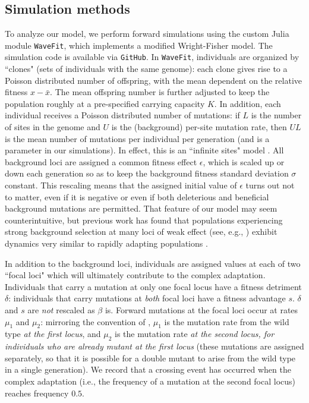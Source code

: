 \documentclass[10pt,twocolumn,twoside]{gsajnl}
\begin{document}
\begin{spacing}{1.5}
\section{Simulation methods}

To analyze our model, we perform forward simulations using the custom Julia module \texttt{WaveFit}, which implements a modified Wright-Fisher model.
The simulation code is available via \texttt{GitHub}.
In \texttt{WaveFit}, individuals are organized by ``clones" (sets of individuals with the same genome): each clone gives rise to a Poisson distributed number of offspring, with the mean dependent on the relative fitness $x-\bar{x}$.
The mean offspring number is further adjusted to keep the population roughly at a pre-specified carrying capacity $K$.
In addition, each individual receives a Poisson distributed number of mutations: if $L$ is the number of sites in the genome and $U$ is the (background) per-site mutation rate, then $UL$ is the mean number of mutations per individual per generation (and is a parameter in our simulations).
In effect, this is an ``infinite sites" model \citep{Kimura:1971,Watterson:1975}.
All background loci are assigned a common fitness effect $\epsilon$, which is scaled up or down each generation so as to keep the background fitness standard deviation $\sigma$ constant.
This rescaling means that the assigned initial value of $\epsilon$ turns out not to matter, even if it is negative or even if both deleterious and beneficial background mutations are permitted.
That feature of our model may seem counterintuitive, but previous work has found that populations experiencing strong background selection at many loci of weak effect (see, e.g., \citet{cvijovic_2018}) exhibit dynamics very similar to rapidly adapting populations \citep{desai_fisher_2007, neher_shraiman_2011}.

In addition to the background loci, individuals are assigned values at each of two ``focal loci" which will ultimately contribute to the complex adaptation.
Individuals that carry a mutation at only one focal locus have a fitness detriment $\delta$: individuals that carry mutations at \emph{both} focal loci have a fitness advantage $s$.
$\delta$ and $s$ are \emph{not} rescaled as $\beta$ is.
Forward mutations at the focal loci occur at rates $\mu_1$ and $\mu_2$: mirroring the convention of \citet{weissman_2009}, $\mu_1$ is the mutation rate from the wild type \emph{at the first locus}, and $\mu_2$ is the mutation rate \emph{at the second locus, for individuals who are already mutant at the first locus} (these mutations are assigned separately, so that it is possible for a double mutant to arise from the wild type in a single generation).
We record that a crossing event has occurred when the complex adaptation (i.e., the frequency of a mutation at the second focal locus) reaches frequency $0.5$.


\end{spacing}
\end{document}
